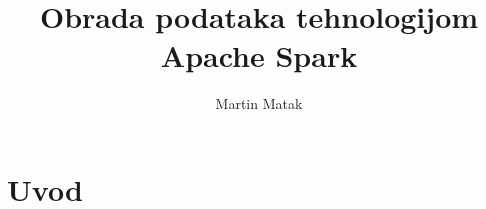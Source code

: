 \documentclass[times, utf8, zavrsni]{fer}
\begin{document}

\title{Obrada podataka tehnologijom Apache Spark}

\author{Martin Matak}

\maketitle



\tableofcontents

\chapter{Uvod}
\end{document}
